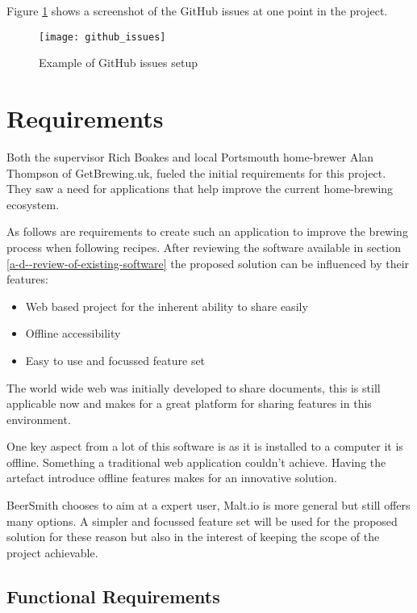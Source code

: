 Figure \ref{figure-github-issues} shows a screenshot of the GitHub issues at one point in the project.

\begin{figure}[H]
  \centering
    \texttt{[image: github\_issues]}
  \caption{Example of GitHub issues setup}
  \label{figure-github-issues}
\end{figure}

\section{Requirements} \label{a-d--requirements}

Both the supervisor Rich Boakes and local Portsmouth home-brewer Alan Thompson of GetBrewing.uk, fueled the initial requirements for this project. They saw a need for applications that help improve the current home-brewing ecosystem.

As follows are requirements to create such an application to improve the brewing process when following recipes. After reviewing the software available in section \ref{a-d--review-of-existing-software} the proposed solution can be influenced by their features:

\begin{itemize}
  \item Web based project for the inherent ability to share easily
  \item Offline accessibility
  \item Easy to use and focussed feature set
\end{itemize}

The world wide web was initially developed to share documents, this is still applicable now and makes for a great platform for sharing features in this environment.

One key aspect from a lot of this software is as it is installed to a computer it is offline. Something a traditional web application couldn't achieve. Having the artefact introduce offline features makes for an innovative solution.

BeerSmith chooses to aim at a expert user, Malt.io is more general but still offers many options. A simpler and focussed feature set will be used for the proposed solution for these reason but also in the interest of keeping the scope of the project achievable.

\subsection{Functional Requirements} \label{a-d--requirements--functional}


